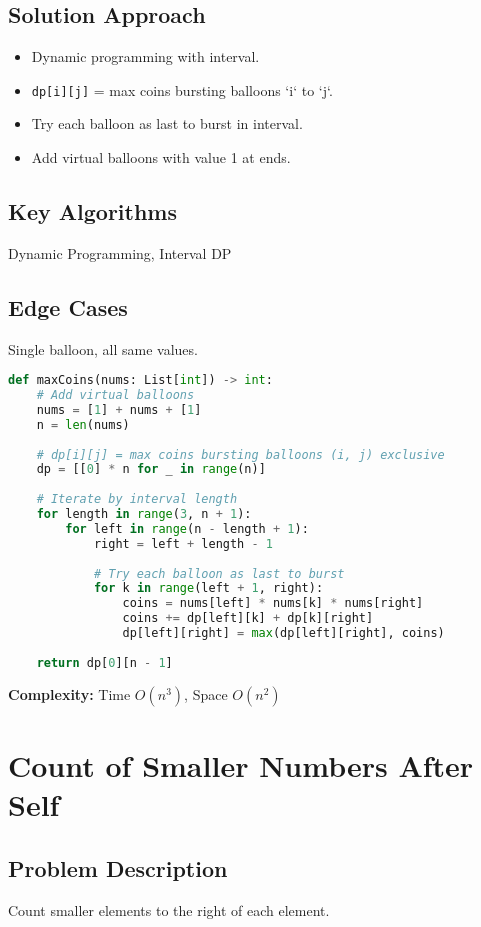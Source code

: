 \documentclass[10pt, a4paper]{article}
\begin{document}
\subsection*{Solution Approach}
\begin{itemize}
    \item Dynamic programming with interval.
    \item \texttt{dp[i][j]} = max coins bursting balloons `i` to `j`.
    \item Try each balloon as last to burst in interval.
    \item Add virtual balloons with value 1 at ends.
\end{itemize}

\subsection*{Key Algorithms}
Dynamic Programming, Interval DP

\subsection*{Edge Cases}
Single balloon, all same values.

\begin{lstlisting}[language=Python]
def maxCoins(nums: List[int]) -> int:
    # Add virtual balloons
    nums = [1] + nums + [1]
    n = len(nums)
    
    # dp[i][j] = max coins bursting balloons (i, j) exclusive
    dp = [[0] * n for _ in range(n)]
    
    # Iterate by interval length
    for length in range(3, n + 1):
        for left in range(n - length + 1):
            right = left + length - 1
            
            # Try each balloon as last to burst
            for k in range(left + 1, right):
                coins = nums[left] * nums[k] * nums[right]
                coins += dp[left][k] + dp[k][right]
                dp[left][right] = max(dp[left][right], coins)
    
    return dp[0][n - 1]
\end{lstlisting}
\textbf{Complexity:} Time $O(n^3)$, Space $O(n^2)$

\section{Count of Smaller Numbers After Self}
\subsection*{Problem Description}
Count smaller elements to the right of each element.
\end{document}
